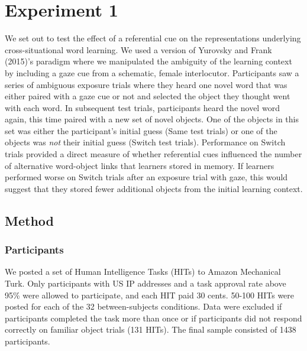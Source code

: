 \documentclass[authoryear, review]{elsarticle}
\begin{document}
\section{Experiment 1}\label{experiment-1}

We set out to test the effect of a referential cue on the
representations underlying cross-situational word learning. We used a
version of Yurovsky and Frank (2015)'s paradigm where we manipulated the
ambiguity of the learning context by including a gaze cue from a
schematic, female interlocutor. Participants saw a series of ambiguous
exposure trials where they heard one novel word that was either paired
with a gaze cue or not and selected the object they thought went with
each word. In subsequent test trials, participants heard the novel word
again, this time paired with a new set of novel objects. One of the
objects in this set was either the participant's initial guess (Same
test trials) or one of the objects was \emph{not} their initial guess
(Switch test trials). Performance on Switch trials provided a direct
measure of whether referential cues influenced the number of alternative
word-object links that learners stored in memory. If learners performed
worse on Switch trials after an exposure trial with gaze, this would
suggest that they stored fewer additional objects from the initial
learning context.

\subsection{Method}\label{method}

\subsubsection{Participants}\label{participants}

We posted a set of Human Intelligence Tasks (HITs) to Amazon Mechanical
Turk. Only participants with US IP addresses and a task approval rate
above 95\% were allowed to participate, and each HIT paid 30 cents.
50-100 HITs were posted for each of the 32 between-subjects conditions.
Data were excluded if participants completed the task more than once or
if participants did not respond correctly on familiar object trials (131
HITs). The final sample consisted of 1438 participants.
\end{document}
